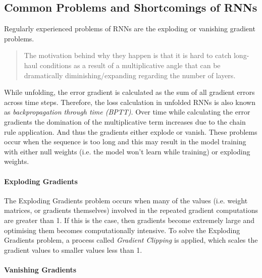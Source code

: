         \subsection{Common Problems and Shortcomings of RNNs}
        \label{sec:shortcomings-of-rnns-background}

            Regularly experienced problems of RNNs are the exploding or vanishing gradient problems.
            \begin{quote}
                The motivation behind why they happen is that it is hard to catch long-haul conditions as a result of a multiplicative angle that can be dramatically diminishing/expanding regarding the number of layers. \cite{parikhDisadvantagesRNN2021}
            \end{quote}
            While unfolding, the error gradient is calculated as the sum of all gradient errors across time steps. Therefore, the loss calculation in unfolded RNNs is also known as \emph{backpropagation through time (BPTT)}.
            Over time while calculating the error gradients the domination of the multiplicative term increases due to the chain rule application. And thus the gradients either explode or vanish.
            These problems occur when the sequence is too long and this may result in the model training with either null weights (i.e. the model won't learn while training) or exploding weights.
            
            \paragraph{Exploding Gradients}
            \label{par:exploding-gradients-background}

                The Exploding Gradients problem occurs when many of the values (i.e. weight matrices, or gradients themselves) involved in the repeated gradient computations are greater than 1. 
                If this is the case, then gradients become extremely large and optimising them becomes computationally intensive.
                To solve the Exploding Gradients problem, a process called \emph{Gradient Clipping} is applied, which scales the gradient values to smaller values less than 1.


            \paragraph{Vanishing Gradients}
            \label{par:vanishing-gradients-background}

